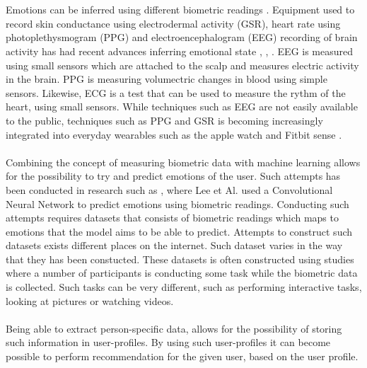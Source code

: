 \\ \\
Emotions can be inferred using different biometric readings \cite{RecognizingEmotion}.
Equipment used to record skin conductance using electrodermal activity (GSR), heart rate using photoplethysmogram (PPG) and electroencephalogram (EEG) recording of brain activity has had recent advances inferring emotional state \cite{RecognizingEmotion}, \cite{EEGEmotion}, \cite{EmotionSense}.
EEG is measured using small sensors which are attached to the scalp and measures electric activity in the brain. PPG is measuring volumectric changes in blood using simple sensors. Likewise, ECG is a test that can be used to measure the rythm of the heart, using small sensors. 
While techniques such as EEG are not easily available to the public, techniques such as PPG and GSR is becoming increasingly integrated into everyday wearables such as the apple watch \cite{AppleWatch,gsrwatch} and Fitbit sense \cite{fitbitSense}. 
\\ \\
Combining the concept of measuring biometric data with machine learning allows for the possibility to try and predict emotions of the user. Such attempts has been conducted in research such as \cite{CNNEmotionDetection}, where Lee et Al. used a Convolutional Neural Network to predict emotions using biometric readings. 
Conducting such attempts requires datasets that consists of biometric readings which maps to emotions that the model aims to be able to predict. Attempts to construct such datasets exists different places on the internet. Such dataset varies in the way that they has been constucted. These datasets is often constructed using studies where a number of participants is conducting some task while the biometric data is collected. Such tasks can be very different, such as performing interactive tasks\cite{CLAS}, looking at pictures\cite{IAPS} or watching videos\cite{FilmClips}. 
\\ \\
Being able to extract person-specific data, allows for the possibility of storing such information in user-profiles\cite{UserProfiling}.
By using such user-profiles it can become possible to perform recommendation for the given user, based on the user profile\cite{InferringEmotionalState}. 
